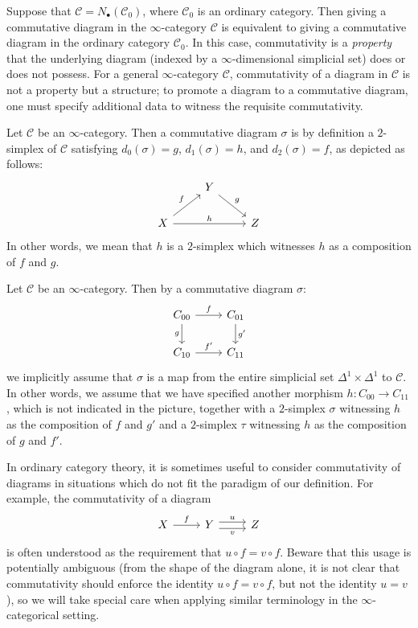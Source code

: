 \begin{remark}
Suppose that $\mathcal{C}=N_\bullet(\mathcal{C}_0)$, where $\mathcal{C}_0$ is an ordinary category. Then giving a commutative diagram in the $\infty$-category $\mathcal{C}$ is equivalent to giving a commutative diagram in the ordinary category $\mathcal{C}_0$. In this case, commutativity is a \textit{property} that the underlying diagram (indexed by a $\infty$-dimensional simplicial set) does or does not possess. For a general $\infty$-category $\mathcal{C}$, commutativity of a diagram in $\mathcal{C}$ is not a property but a structure; to promote a diagram to a commutative diagram, one must specify additional data to witness the requisite commutativity.
\end{remark}
\begin{example}
Let $\mathcal{C}$ be an $\infty$-category. Then a commutative diagram $\sigma$ is by definition a $2$-simplex of $\mathcal{C}$ satisfying $d_0(\sigma)=g$, $d_1(\sigma)=h$, and $d_2(\sigma)=f$, as depicted as follows:
\[\begin{tikzcd}
&Y\ar[rd,"g"]&\\
X\ar[ru,"f"]\ar[rr,"h"]&&Z
\end{tikzcd}\]
In other words, we mean that $h$ is a $2$-simplex which witnesses $h$ as a composition of $f$ and $g$.
\end{example}
\begin{example}
Let $\mathcal{C}$ be an $\infty$-category. Then by a commutative diagram $\sigma$:
\[\begin{tikzcd}
C_{00}\ar[r,"f"]\ar[d,swap,"g"]&C_{01}\ar[d,"g'"]\\
C_{10}\ar[r,"f'"]&C_{11}
\end{tikzcd}\]
we implicitly assume that $\sigma$ is a map from the entire simplicial set $\Delta^1\times\Delta^1$ to $\mathcal{C}$. In other words, we assume that we have specified another morphism $h:C_{00}\to C_{11}$, which is not indicated in the picture, together with a $2$-simplex $\sigma$ witnessing $h$ as the composition of $f$ and $g'$ and a $2$-simplex $\tau$ witnessing $h$ as the composition of $g$ and $f'$.
\end{example}
\begin{remark}
In ordinary category theory, it is sometimes useful to consider commutativity of diagrams in situations which do not fit the paradigm of our definition. For example, the commutativity of a diagram 
\[\begin{tikzcd}
X\ar[r,"f"]&Y\ar[r,shift left=1mm,"u"]\ar[r,shift right=1mm,swap,"v"]&Z
\end{tikzcd}\]
is often understood as the requirement that $u\circ f=v\circ f$. Beware that this usage is potentially ambiguous (from the shape of the diagram alone, it is not clear that commutativity should
enforce the identity $u\circ f=v\circ f$, but not the identity $u=v$), so we will take special care when applying similar terminology in the $\infty$-categorical setting.
\end{remark}
